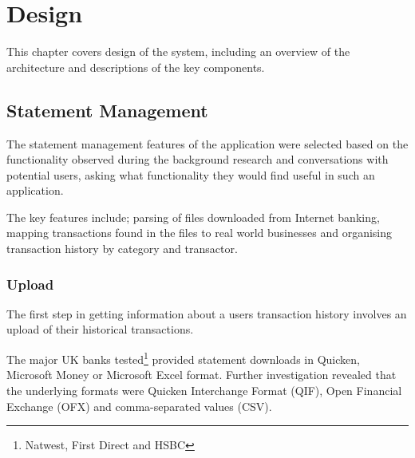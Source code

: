 \chapter{Design}
\label{cha:design}

\begin{comment}
Chapter 3: Design
This chapter starts to describe the student's own work. It is where the main design aspects of the project are described. The style of presentation may reflect the life cycle of the project, for example commencing with the Requirements Analysis, but it should not read like a diary. The design should be clearly and precisely described with supporting diagrams. The presentation should be at a fairly high level without excessive detail. This chapter is a suitable place to justify your choice of architecture, implementation technologies and APIs used.
\plan{This section contains my PLAN of what I will do (before I started) of my app, it should be programming language independent}
\end{comment}

This chapter covers design of the system, including an overview of the architecture and descriptions of the key components. 

\section{Statement Management}
The statement management features of the application were selected based on the functionality observed during the background research and conversations with potential users, asking what functionality they would find useful in such an application.

The key features include; parsing of files downloaded from Internet banking, mapping transactions found in the files to real world businesses and organising transaction history by category and transactor.

\subsection{Upload}
The first step in getting information about a users transaction history involves an upload of their historical transactions.

The major UK banks tested\footnote{Natwest, First Direct and HSBC} provided statement downloads in Quicken, Microsoft Money or Microsoft Excel format. Further investigation revealed that the underlying formats were Quicken Interchange Format (QIF), Open Financial Exchange (OFX) and comma-separated values (CSV).

